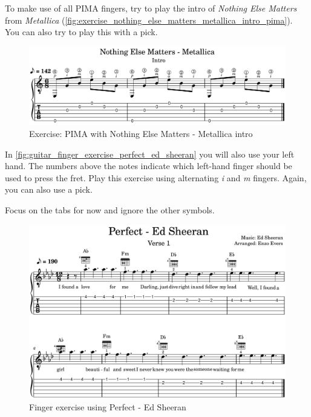 To make use of all PIMA fingers, try to play the intro of \textit{Nothing Else Matters} from \textit{Metallica} (\autoref{fig:exercise_nothing_else_matters_metallica_intro_pima}). You can also try to play this with a pick.

\begin{figure}[h]
    \centering
    \includegraphics[width=\textwidth]{../../MuseScore/Guitar/NothinElseMatters_Metallica_Intro.png}
    \caption{Exercise: PIMA with Nothing Else Matters - Metallica intro}
    \label{fig:exercise_nothing_else_matters_metallica_intro_pima}
\end{figure}

\newpage

In \autoref{fig:guitar_finger_exercise_perfect_ed_sheeran} you will also use your left hand. The numbers above the notes indicate which left-hand finger should be used to press the fret. Play this exercise using alternating \textit{i} and \textit{m} fingers. Again, you can also use a pick.

Focus on the tabs for now and ignore the other symbols.

\begin{figure}[h]
    \centering
    \includegraphics[width=\textwidth]{../../MuseScore/Guitar/GuitarPerfectEdSheeranSingleNotesFirstVerse.png}
    \caption{Finger exercise using Perfect - Ed Sheeran}
    \label{fig:guitar_finger_exercise_perfect_ed_sheeran}
\end{figure}